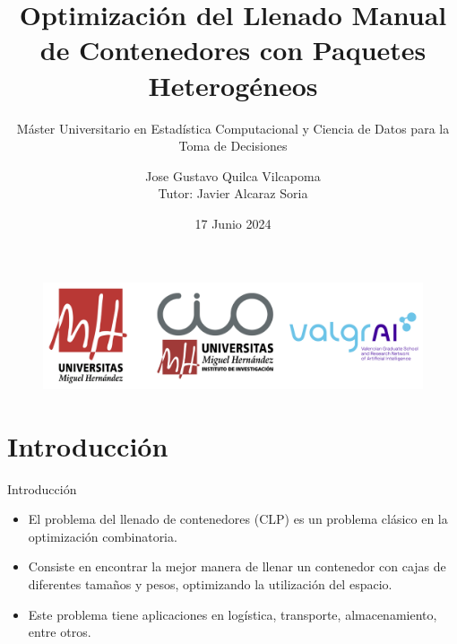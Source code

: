 \documentclass[handout]{beamer}
\author[Gustavo Quilca]{Jose Gustavo Quilca Vilcapoma
\\
\small Tutor: Javier Alcaraz Soria}
\title{Optimización del Llenado Manual de Contenedores con Paquetes Heterogéneos}
\subtitle{Máster Universitario en Estadística Computacional y Ciencia de Datos para la Toma de Decisiones}
\institute[CIO - UMH]{
    Instituto Centro de Investigación Operativa \\
    Universidad Miguel Hernández
}
\date{\small 17 Junio 2024}
\begin{document}
\begin{frame}
    \titlepage
    \vspace*{-0.6cm}
    \begin{figure}[htpb]
        \begin{center}
            \includegraphics[keepaspectratio, scale=0.04]{pic/logos.png}
        \end{center}
    \end{figure}
\end{frame}

\begin{frame}
    \tableofcontents[sectionstyle=show,
        subsectionstyle=show/shaded/hide,
        subsubsectionstyle=show/shaded/hide]
\end{frame}

\section{Introducción}

\begin{frame}{Introducción}
    \begin{itemize}[<+-| alert@+>] %
        \item El problema del llenado de contenedores (CLP) es un
              problema clásico en la optimización combinatoria.
        \item Consiste en encontrar la mejor manera de llenar un contenedor con cajas de diferentes tamaños y pesos, optimizando la utilización del espacio.
        \item Este problema tiene aplicaciones en logística, transporte,
              almacenamiento, entre otros.
    \end{itemize}
\end{frame}
\end{document}
